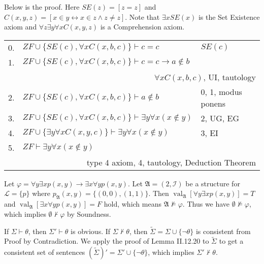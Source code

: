 \documentclass[12pt]{article}
\newcommand{\val}{\mathop{\mathrm{val}}}
\theoremstyle{definition}
\newenvironment{customthm}[1]
  {\renewcommand\theinnercustomthm{#1}\innercustomthm}
  {\endinnercustomthm}
\begin{document}
\begin{customthm}{II.11.15} Below is the proof. Here $SE(z)=[z=z]$ and $C(x,y,z)=[x\in y\leftrightarrow x\in z\wedge z\neq z]$. Note that $\exists xSE(x)$ is the Set Existence axiom and $\forall z\exists y\forall xC(x,y,z)$ is a Comprehension axiom.
\begin{flushleft}
\begin{tabular}{lll}
  0. & $ZF\cup\{SE(c),\forall xC(x,b,c)\}\vdash c=c$ & $SE(c)$ \\
  1. & $ZF\cup\{SE(c),\forall xC(x,b,c)\}\vdash c=c\rightarrow a\not\in b$ & \\
  \multicolumn{3}{r}{$\forall xC(x,b,c)$, UI, tautology} \\
  2. & $ZF\cup\{SE(c),\forall xC(x,b,c)\}\vdash a\not\in b$ & 0, 1, modus ponens \\
  3. & $ZF\cup\{SE(c),\forall xC(x,b,c)\}\vdash\exists y\forall x(x\not\in y)$ & 2, UG, EG \\
  4. & $ZF\cup\{\exists y\forall xC(x,y,c)\}\vdash\exists y\forall x(x\not\in y)$ & 3, EI \\
  5. & $ZF\vdash\exists y\forall x(x\not\in y)$ & \\
  \multicolumn{3}{r}{type 4 axiom, 4, tautology, Deduction Theorem}
\end{tabular}
\end{flushleft}
\end{customthm}

\begin{customthm}{II.11.16} Let $\varphi=\forall y\exists xp(x,y)\rightarrow\exists x\forall yp(x,y)$. Let $\mathfrak{A}=(2,\mathcal{I})$ be a structure for $\mathcal{L}=\{p\}$ where $p_\mathfrak{A}(x,y)=\{(0,0),(1,1)\}$. Then $\val_\mathfrak{A}[\forall y\exists xp(x,y)]=T$ and $\val_\mathfrak{A}[\exists x\forall yp(x,y)]=F$ hold, which means $\mathfrak{A}\not\models\varphi$. Thus we have $\emptyset\not\models\varphi$, which implies $\emptyset\not\vdash\varphi$ by Soundness.
\end{customthm}

\begin{customthm}{II.12.23} If $\Sigma\vdash\theta$, then $\Sigma'\vdash\theta$ is obvious. If $\Sigma\not\vdash\theta$, then $\widetilde\Sigma=\Sigma\cup\{\neg\theta\}$ is consistent from Proof by Contradiction. We apply the proof of Lemma II.12.20 to $\widetilde\Sigma$ to get a consistent set of sentences $(\widetilde\Sigma)'=\Sigma'\cup\{\neg\theta\}$, which implies $\Sigma'\not\vdash\theta$.
\end{customthm}
\end{document}
